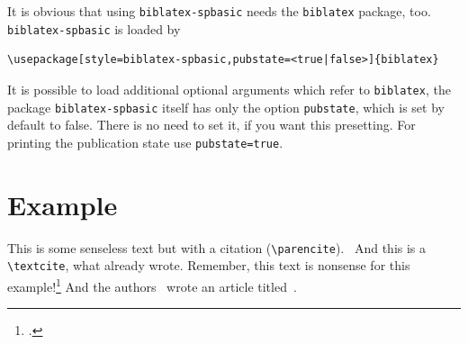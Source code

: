 \documentclass[toc=graduated,parskip=half-,DIV=13,fontsize=11pt,paper=a4]{scrartcl}
\begin{document}
It is obvious that using \texttt{biblatex-spbasic} needs the \texttt{biblatex} package, too. 
\texttt{biblatex-spbasic} is loaded by

\begin{verbatim}
\usepackage[style=biblatex-spbasic,pubstate=<true|false>]{biblatex}
\end{verbatim}

It is possible to load additional optional arguments which refer to \texttt{biblatex}, the package
\texttt{biblatex-spbasic} itself has only the option \texttt{pubstate}, which is set by default to false. There
is no need to set it, if you want this presetting. For printing the publication state use \texttt{pubstate=true}.

\section{Example}
This is some senseless  text but with a citation (\verb|\parencite|).~\parencite[See][pp.~16]{Daan1984}
And this is a \verb|\textcite|, what \textcite[See][pp.~16]{Young2018} already wrote. Remember, this
text is nonsense for this example!\footcite{Young2018}  And the 
authors~\textcite{Darwin1880} wrote an article titled~.

\nocite{*}
\printbibliography[title=Bibliography]
\end{document}
